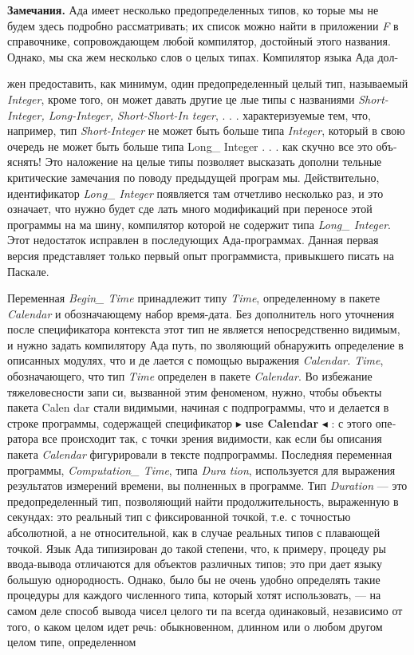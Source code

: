 \documentclass{mai_book}
\begin{document}
\begin{center}
\parbox{12cm} {
{\bf Замечания.} Ада имеет несколько предопределенных типов, ко­
торые мы не будем здесь подробно рассматривать; их список
можно найти в приложении {\it F} в справочнике, сопровождающем
любой компилятор, достойный этого названия. Однако, мы ска­
жем несколько слов о целых типах. Компилятор языка Ада дол-}
\end{center}
\newpage
\begin{center}
\parbox{12cm}{
жен предоставить, как минимум, один предопределенный целый
тип, называемый {\it Integer}, кроме того, он может давать другие це­
лые типы с названиями {\it Short-Integer, Long-Integer, Short-Short-In­
teger}, . . . характеризуемые тем, что, например, тип {\it Short-Integer}
не может быть больше типа {\it Integer}, который в свою очередь не
может быть больше типа {Long\_ Integer} . . . как скучно все это объ­
яснять!
Это наложение на целые типы позволяет высказать дополни­
тельные критические замечания по поводу предыдущей програм­
мы. Действительно, идентификатор {\it Long\_ Integer} появляется там
отчетливо несколько раз, и это означает, что нужно будет сде­
лать много модификаций при переносе этой программы на ма­
шину, компилятор которой не содержит типа {\it Long\_ Integer}. Этот
недостаток исправлен в последующих Ада-программах. Данная
первая версия представляет только первый опыт программиста,
привыкшего писать на Паскале.}
\end{center}
Переменная {\it Begin\_ Time} принадлежит типу {\it Time}, определенному в
пакете {\it Calendar} и обозначающему набор время-дата. Без дополнитель­
ного уточнения после спецификатора контекста этот тип не является
непосредственно видимым, и нужно задать компилятору Ада путь, по­
зволяющий обнаружить определение в описанных модулях, что и де­
лается с помощью выражения {\it Calendar. Time}, обозначающего, что тип
{\it Time} определен в пакете {\it Calendar}. Во избежание тяжеловесности запи­
си, вызванной этим феноменом, нужно, чтобы объекты пакета Calen­
dar стали видимыми, начиная с подпрограммы, что и делается в строке
программы, содержащей спецификатор $\blacktriangleright$ {\bf use Calendar }$\blacktriangleleft$ : с этого опе­
ратора все происходит так, с точки зрения видимости, как если бы
описания пакета {\it Calendar} фигурировали в тексте подпрограммы.
Последняя переменная программы, {\it Computation\_ Time}, типа {\it Dura­
tion}, используется для выражения результатов измерений времени, вы­
полненных в программе. Тип {\it Duration} — это предопределенный тип,
позволяющий найти продолжительность, выраженную в секундах: это
реальный тип с фиксированной точкой, т.е. с точностью абсолютной,
а не относительной, как в случае реальных типов с плавающей точкой.
Язык Ада типизирован до такой степени, что, к примеру, процеду­
ры ввода-вывода отличаются для объектов различных типов; это при­
дает языку большую однородность. Однако, было бы не очень удобно
определять такие процедуры для каждого численного типа, который
хотят использовать, — на самом деле способ вывода чисел целого ти­
па всегда одинаковый, независимо от того, о каком целом идет речь:
обыкновенном, длинном или о любом другом целом типе, определенном
\end{document}

